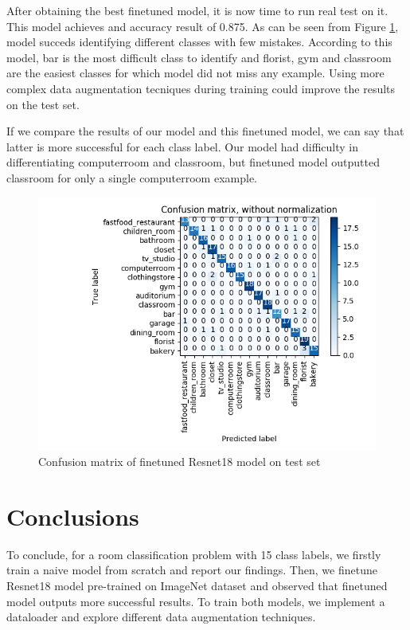 \documentclass{article}
\begin{document}
After obtaining the best finetuned model, it is now time to run real test on it. This model achieves and accuracy result of 0.875. As can be seen from Figure \ref{fig:resnet18ConfusionMatrix}, model succeds identifying different classes with few mistakes. According to this model, bar is the most difficult class to identify and florist, gym and classroom are the easiest classes for which model did not miss any example. Using more complex data augmentation tecniques during training could improve the results on the test set.

If we compare the results of our model and this finetuned model, we can say that latter is more successful for each class label. Our model had difficulty in differentiating computerroom and classroom, but finetuned model outputted classroom for only a single computerroom example.

\begin{figure}
  \includegraphics[width=\linewidth]{resnet18ConfusionMatrix.png}
  \caption{Confusion matrix of finetuned Resnet18 model on test set}
  \label{fig:resnet18ConfusionMatrix}
\end{figure}

\section{Conclusions}
 
To conclude, for a room classification problem with 15 class labels, we firstly train a naive model from scratch and report our findings. Then, we finetune Resnet18 model pre-trained on ImageNet dataset and observed that finetuned model outputs more successful results. To train both models, we implement a dataloader and explore different data augmentation techniques.
 
{\small


}
\end{document}
